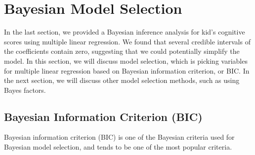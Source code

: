 \documentclass[]{book}
\theoremstyle{definition}
\theoremstyle{definition}
\theoremstyle{definition}
\theoremstyle{remark}
\begin{document}
\chapter{Bayesian Model Selection}\label{bayesian-model-selection}

In the last section, we provided a Bayesian inference analysis for kid's
cognitive scores using multiple linear regression. We found that several
credible intervals of the coefficients contain zero, suggesting that we
could potentially simplify the model. In this section, we will discuss
model selection, which is picking variables for multiple linear
regression based on Bayesian information criterion, or BIC. In the next
section, we will discuss other model selection methods, such as using
Bayes factors.

\section{Bayesian Information Criterion
(BIC)}\label{bayesian-information-criterion-bic}

Bayesian information criterion (BIC) is one of the Bayesian criteria
used for Bayesian model selection, and tends to be one of the most
popular criteria.


\end{document}

